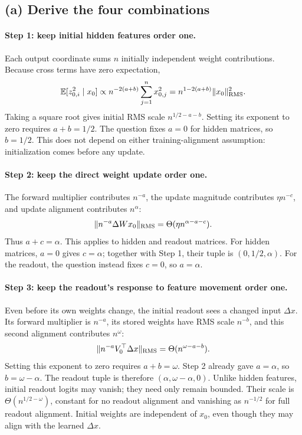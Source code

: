 \documentclass{article}
\begin{document}
\subsection{(a) Derive the four combinations}

\paragraph{Step 1: keep initial hidden features order one.}
Each output coordinate sums $n$ initially independent weight contributions.
Because cross terms have zero expectation,
\[
\mathbb E[z_{0,i}^2\mid x_0]
\propto n^{-2(a+b)}\sum_{j=1}^n x_{0,j}^2
=n^{1-2(a+b)}\|x_0\|_{\rm RMS}^2.
\]
Taking a square root gives initial RMS scale $n^{1/2-a-b}$.
Setting its exponent to zero requires $a+b=1/2$. The question fixes
$a=0$ for hidden matrices, so $b=1/2$. This does not depend on either
training-alignment assumption: initialization comes before any update.

\paragraph{Step 2: keep the direct weight update order one.}
The forward multiplier contributes $n^{-a}$, the update magnitude
contributes $\eta n^{-c}$, and update alignment contributes $n^\alpha$:
\[
\|n^{-a}\Delta W x_0\|_{\rm RMS}
=\Theta(\eta n^{\alpha-a-c}).
\]
Thus $a+c=\alpha$. This applies to hidden and readout matrices.
For hidden matrices, $a=0$ gives $c=\alpha$; together with Step 1,
their tuple is $(0,1/2,\alpha)$.
For the readout, the question instead fixes $c=0$, so $a=\alpha$.

\paragraph{Step 3: keep the readout's response to feature movement order one.}
Even before its own weights change, the initial readout sees a changed
input $\Delta x$. Its forward multiplier is $n^{-a}$, its stored weights
have RMS scale $n^{-b}$, and this second alignment contributes $n^\omega$:
\[
\|n^{-a}V_0^\top\Delta x\|_{\rm RMS}
=\Theta(n^{\omega-a-b}).
\]
Setting this exponent to zero requires $a+b=\omega$. Step 2 already
gave $a=\alpha$, so $b=\omega-\alpha$. The readout tuple is therefore
$(\alpha,\omega-\alpha,0)$.
Unlike hidden features, initial readout logits may vanish; they need
only remain bounded. Their scale is
$\Theta(n^{1/2-\omega})$, constant for no readout alignment and vanishing
as $n^{-1/2}$ for full readout alignment. Initial weights are independent
of $x_0$, even though they may align with the learned $\Delta x$.
\end{document}
